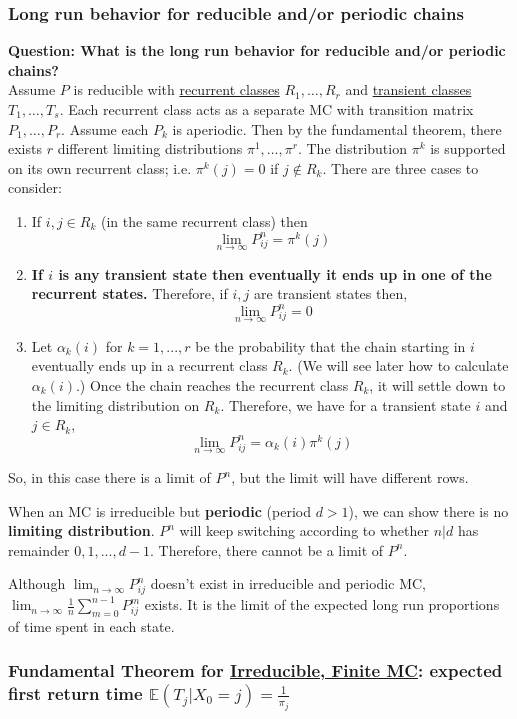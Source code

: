\documentclass[11pt,a4paper]{article}
\begin{document}
\subsubsection{Long run behavior for reducible and/or periodic chains}
\textbf{Question: What is the long run behavior for reducible and/or periodic chains?}\\
Assume $P$ is reducible with \underline{recurrent classes} $R_1, \ldots, R_r$ and \underline{transient classes} $T_1, \ldots, T_s$. Each recurrent class acts as a separate $\mathrm{MC}$ with transition matrix $P_1, \ldots, P_r$. Assume each $P_k$ is aperiodic. Then by the fundamental theorem, there exists $r$ different limiting distributions $\pi^1, \ldots, \pi^r$. The distribution $\pi^k$ is supported on its own recurrent class; i.e. $\pi^k(j)=0$ if $j \notin R_k .$ There are three cases to consider:
\begin{enumerate}
    \item If $i,j\in R_k$ (in the same recurrent class) then $$\lim_{n \rightarrow \infty}P_{ij}^n=\pi^k(j)$$
    \item \textbf{If $i$ is any transient state then eventually it ends up in one of the recurrent states.} Therefore, if $i,j$ are transient states then, $$\lim_{n \rightarrow \infty}P_{ij}^n=0$$
    \item Let $\alpha_k(i)$ for $k = 1,...,r$ be the probability that the chain starting in $i$ eventually ends up in a recurrent class $R_k$. (We will see later how to calculate $\alpha_k(i)$.) Once the chain reaches the recurrent class $R_k$, it will settle down to the limiting distribution on $R_k$. Therefore, we have for a transient state $i$ and $j \in R_k$, $$\lim_{n \rightarrow \infty}P_{ij}^n=\alpha_k(i)\pi^k(j)$$
\end{enumerate}
So, in this case there is a limit of $P^n$, but the limit will have different rows.

When an MC is irreducible but \textbf{periodic} (period $d>1$), we can show there is no \textbf{limiting distribution}. $P^n$ will keep switching according to whether $n|d$ has remainder $0,1,...,d-1$. Therefore, there cannot be a limit of $P^n$.

Although $\lim_{n \rightarrow \infty}P_{ij}^n$ doesn't exist in irreducible and periodic MC, $\lim_{n \rightarrow \infty}\frac{1}{n}\sum_{m=0}^{n-1}P_{ij}^m$ exists. It is the limit of the expected long run proportions of time spent in each state.

\subsubsection{Fundamental Theorem for \underline{Irreducible, Finite MC}: expected first return time $\mathbb{E}(T_j|X_0 = j)=\frac{1}{\pi_j}$}
\end{document}
